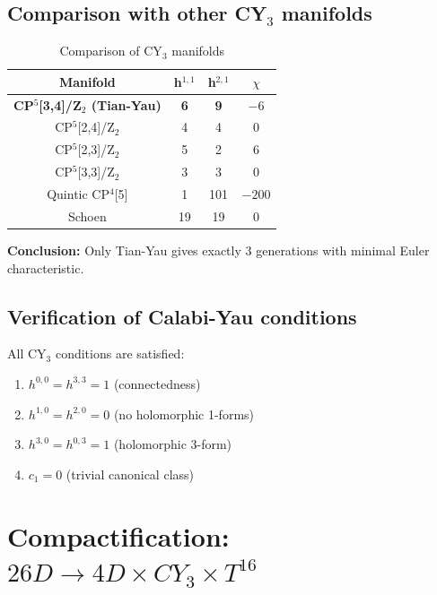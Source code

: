 \documentclass[12pt,a4paper,twoside]{article}
\newcommand{\checkmarkgreen}{\textcolor{emerald}{\checkmark}}
\theoremstyle{definition}
\begin{document}
\subsection{Comparison with other CY$_3$ manifolds}

\begin{table}[H]
\centering
\small
\caption{Comparison of CY$_3$ manifolds}
\label{tab:cy3_comparison}
\begin{tabular}{c|c|c|c}
\toprule
\textbf{Manifold} & \textbf{h$^{1,1}$} & \textbf{h$^{2,1}$} & \textbf{$\chi$} \\
\midrule
\textbf{CP$^5$[3,4]/Z$_2$ (Tian-Yau)} & \textbf{6} & \textbf{9} & \textbf{$-6$} \\
CP$^5$[2,4]/Z$_2$ & 4 & 4 & 0 \\
CP$^5$[2,3]/Z$_2$ & 5 & 2 & 6 \\
CP$^5$[3,3]/Z$_2$ & 3 & 3 & 0 \\
Quintic CP$^4$[5] & 1 & 101 & $-200$ \\
Schoen & 19 & 19 & 0 \\
\bottomrule
\end{tabular}
\end{table}

\textbf{Conclusion:} Only Tian-Yau gives exactly 3 generations with minimal Euler characteristic.

\subsection{Verification of Calabi-Yau conditions}

All CY$_3$ conditions are satisfied:
\begin{enumerate}
    \item $h^{0,0} = h^{3,3} = 1$ (connectedness) \checkmarkgreen
    \item $h^{1,0} = h^{2,0} = 0$ (no holomorphic 1-forms) \checkmarkgreen
    \item $h^{3,0} = h^{0,3} = 1$ (holomorphic 3-form) \checkmarkgreen
    \item $c_1 = 0$ (trivial canonical class) \checkmarkgreen
\end{enumerate}

\section{Compactification: \texorpdfstring{$26D \to 4D \times CY_3 \times T^{16}$}{26D -> 4D x CY3 x T16}}
\label{sec:compactification}
\end{document}
